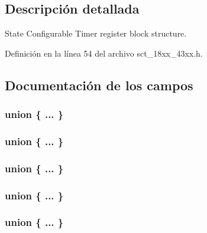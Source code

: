 \subsection{Descripción detallada}
State Configurable Timer register block structure. 

Definición en la línea 54 del archivo sct\+\_\+18xx\+\_\+43xx.\+h.



\subsection{Documentación de los campos}
\subsubsection[{\texorpdfstring{"@28}{@28}}]{\setlength{\rightskip}{0pt plus 5cm}union \{ ... \} }\hypertarget{struct_l_p_c___s_c_t___t_ab47e7bdfd0ecf329789758fb52b4f91e}{}\label{struct_l_p_c___s_c_t___t_ab47e7bdfd0ecf329789758fb52b4f91e}
\subsubsection[{\texorpdfstring{"@30}{@30}}]{\setlength{\rightskip}{0pt plus 5cm}union \{ ... \} }\hypertarget{struct_l_p_c___s_c_t___t_a6d03b2522c824f31ef145243b601f304}{}\label{struct_l_p_c___s_c_t___t_a6d03b2522c824f31ef145243b601f304}
\subsubsection[{\texorpdfstring{"@32}{@32}}]{\setlength{\rightskip}{0pt plus 5cm}union \{ ... \} }\hypertarget{struct_l_p_c___s_c_t___t_af0677bb3e3ceef6cc02b5de0fff2ab57}{}\label{struct_l_p_c___s_c_t___t_af0677bb3e3ceef6cc02b5de0fff2ab57}
\subsubsection[{\texorpdfstring{"@34}{@34}}]{\setlength{\rightskip}{0pt plus 5cm}union \{ ... \} }\hypertarget{struct_l_p_c___s_c_t___t_af4315e8d4f218d078d03c13de04eb704}{}\label{struct_l_p_c___s_c_t___t_af4315e8d4f218d078d03c13de04eb704}
\subsubsection[{\texorpdfstring{"@36}{@36}}]{\setlength{\rightskip}{0pt plus 5cm}union \{ ... \} }\hypertarget{struct_l_p_c___s_c_t___t_a67b02beaa8fa34b5278b8bb2fc0c226c}{}\label{struct_l_p_c___s_c_t___t_a67b02beaa8fa34b5278b8bb2fc0c226c}
